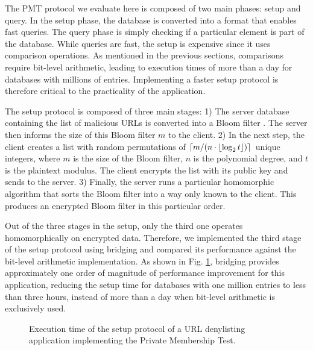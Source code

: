 The PMT protocol we evaluate here is composed of two main phases: setup and query. In the setup phase, the database is converted into a format that enables fast queries. The query phase is simply checking if a particular element is part of the database.
While queries are fast, the setup is expensive since it uses comparison operations. As mentioned in the previous sections, comparisons require bit-level arithmetic, leading to execution times of more than a day for databases with millions of entries. Implementing a faster setup protocol is therefore critical to the practicality of the application. 

The setup protocol is composed of three main stages: 1) The server database containing the list of malicious URLs is converted into a Bloom filter \cite{bloomfilter}. The server then informs the size of this Bloom filter $m$ to the client. 2) In the next step, the client creates a list with random permutations of \mbox{$\lceil {m}/({n \cdot \lfloor\log_{2}{t}\rfloor} ) \rceil$} unique integers, where $m$ is the size of the Bloom filter, $n$ is the polynomial degree, and $t$ is the plaintext modulus. The client encrypts the list with its public key and sends to the server. 3) Finally, the server runs a particular homomorphic algorithm that sorts the Bloom filter into a way only known to the client. This produces an encrypted Bloom filter in this particular order.

Out of the three stages in the setup, only the third one operates homomorphically on encrypted data. Therefore, we implemented the third stage of the setup protocol using bridging and compared its performance against the bit-level arithmetic implementation.
As shown in Fig. \ref{fig:application}, bridging provides approximately one order of magnitude of performance improvement for this application, reducing the setup time for databases with one million entries to less than three hours, instead of more than a day when bit-level arithmetic is exclusively used.

\begin{figure}[t]
	\centering
	\caption{Execution time of the setup protocol of a URL denylisting application \cite{urldenylist} implementing the Private Membership Test.}
	\label{fig:application}
\end{figure}

